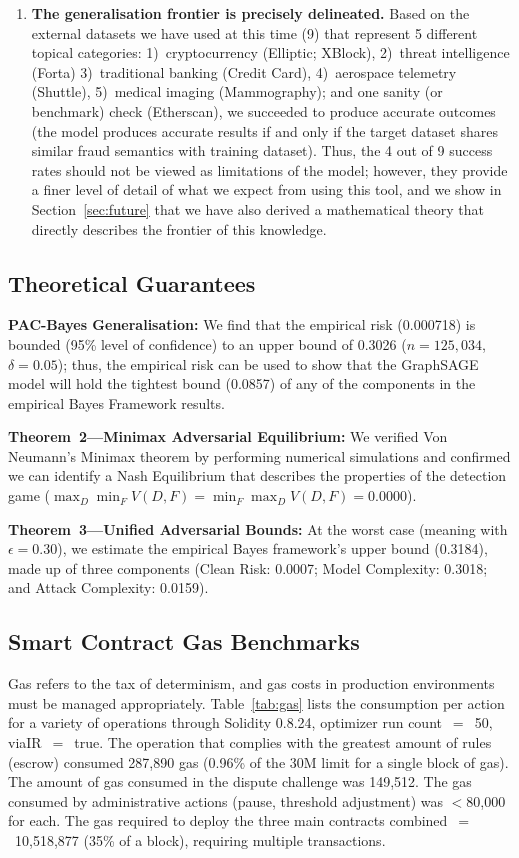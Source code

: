\documentclass[journal]{IEEEtran}
\begin{document}
\begin{enumerate}
\item \textbf{The generalisation frontier is precisely delineated.} Based on the external datasets we have used at this time (9) that represent 5 different topical categories: 1)~cryptocurrency (Elliptic; XBlock), 2)~threat intelligence (Forta) 3)~traditional banking (Credit Card), 4)~aerospace telemetry (Shuttle), 5)~medical imaging (Mammography); and one sanity (or benchmark) check (Etherscan), we succeeded to produce accurate outcomes (the model produces accurate results if and only if the target dataset shares similar fraud semantics with training dataset). Thus, the 4 out of 9 success rates should not be viewed as limitations of the model; however, they provide a finer level of detail of what we expect from using this tool, and we show in Section~\ref{sec:future} that we have also derived a mathematical theory that directly describes the frontier of this knowledge.
\end{enumerate}

\subsection{Theoretical Guarantees}

\textbf{PAC-Bayes Generalisation:} We find that the empirical risk (0.000718) is bounded (95\% level of confidence) to an upper bound of 0.3026 ($n = 125{,}034$, $\delta = 0.05$); thus, the empirical risk can be used to show that the GraphSAGE model will hold the tightest bound (0.0857) of any of the components in the empirical Bayes Framework results.

\textbf{Theorem~2---Minimax Adversarial Equilibrium:} We verified Von Neumann's Minimax theorem by performing numerical simulations and confirmed we can identify a Nash Equilibrium that describes the properties of the detection game ($\max_D \min_F V(D,F) = \min_F \max_D V(D,F) = 0.0000$).

\textbf{Theorem~3---Unified Adversarial Bounds:} At the worst case (meaning with $\epsilon = 0.30$), we estimate the empirical Bayes framework's upper bound (0.3184), made up of three components (Clean Risk: 0.0007; Model Complexity: 0.3018; and Attack Complexity: 0.0159).

\subsection{Smart Contract Gas Benchmarks}

Gas refers to the tax of determinism, and gas costs in production environments must be managed appropriately. Table~\ref{tab:gas} lists the consumption per action for a variety of operations through Solidity 0.8.24, optimizer run count~$=$~50, viaIR~$=$~true. The operation that complies with the greatest amount of rules (escrow) consumed 287,890 gas (0.96\% of the 30M limit for a single block of gas). The amount of gas consumed in the dispute challenge was 149,512. The gas consumed by administrative actions (pause, threshold adjustment) was $<$80,000 for each. The gas required to deploy the three main contracts combined~$=$~10,518,877 (35\% of a block), requiring multiple transactions.
\end{document}
